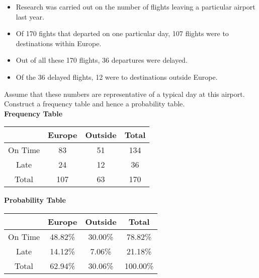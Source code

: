 \documentclass[a4paper,12pt]{article}
\begin{document}
\begin{itemize}
	\item Research was carried out on the number of flights leaving a particular airport last year. 
	
	\item Of 170 fights that departed on one particular day, 107 flights were to destinations within Europe. 
	\item Out of all these 170 flights, 36 departures were delayed. 
	
	\item Of the 36 delayed flights, 12 were to destinations outside Europe. 
	
	
\end{itemize}




Assume that these numbers are representative of a typical 
day at this airport. Construct a frequency table and hence a probability table.\\ \bigskip
\textbf{Frequency Table}\\ \bigskip
\begin{tabular}{|c|c|c||c|}
	\hline  &  \phantom{sp} Europe \phantom{sp} & \phantom{sp} Outside \phantom{sp} &\phantom{sp} Total\phantom{sp}  \\ 
	\hline On Time  & 83 & 51 & 134 \\ 
	\hline Late & 24 & 12 & 36 \\ \hline
	\hline Total  & 107 & 63  & 170  \\ 
	\hline 
\end{tabular} 







\textbf{Probability Table} \\ \bigskip
\begin{tabular}{|c|c|c||c|}
	\hline  &  \phantom{sp} Europe \phantom{sp} & \phantom{sp} Outside \phantom{sp} & \phantom{sp} Total\phantom{sp}  \\ 
	\hline On Time  & 48.82\% & 30.00\% & 78.82\% \\ 
	\hline Late & 14.12\% & 7.06\% &  21.18\% \\ \hline
	\hline Total  & 62.94\% & 30.06\% & 100.00\% \\ 
	\hline 
\end{tabular} 
\end{document}
